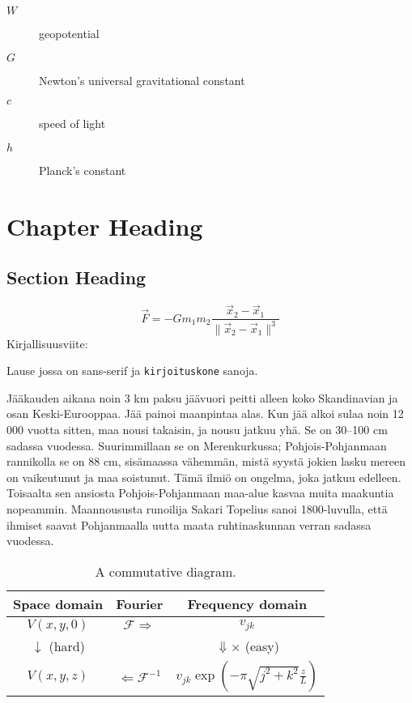 \documentclass[dissertation,vertlayout,pdfa,colorlinks,nologo,table]{aaltoseries}
\begin{document}
\symbols

\begin{description}
\item[$W$] geopotential
\item[$G$] Newton's universal gravitational constant
\item[$c$] speed of light
\item[$h$] Planck's constant
\end{description}


\chapter{Chapter Heading}
\section{Section Heading}
\[
\vec{F}=-G m_1 m_2 \frac{\vec{x}_2-\vec{x}_1}{\lVert{\vec{x}_2-\vec{x}_1}\rVert^3}
\]
\lipsum[1-2]
Kirjallisuusviite: \cite{Knuth1984:The-TeXbook}

Lause jossa on \textsf{sans-serif} ja \texttt{kirjoituskone} sanoja.

Jääkauden aikana noin 3 km paksu jäävuori peitti alleen koko Skandinavian ja
osan Keski-Eurooppaa. Jää painoi maanpintaa alas. Kun jää alkoi sulaa noin 12
000 vuotta sitten, maa nousi takaisin, ja nousu jatkuu yhä. Se on 30–100 cm
sadassa vuodessa. Suurimmillaan se on Merenkurkussa; Pohjois-Pohjanmaan
rannikolla se on 88 cm, sisämaassa vähemmän, mistä syystä jokien lasku mereen
on vaikeutunut ja maa soistunut. Tämä ilmiö on ongelma, joka jatkuu edelleen.
Toisaalta sen ansiosta Pohjois-Pohjanmaan maa-alue kasvaa muita maakuntia
nopeammin. Maannoususta runoilija Sakari Topelius sanoi 1800-luvulla, että
ihmiset saavat Pohjanmaalla uutta maata ruhtinaskunnan verran sadassa vuodessa.

\begin{table}
\caption{A commutative diagram.}
\begin{tabular}{ccc}
\hline
Space domain & Fourier & Frequency domain\tabularnewline
\hline
$V\left(x,y,0\right)$ & $\mathcal{F}\Longrightarrow$ & $v_{jk}$\tabularnewline
$\downarrow$ (hard) &  & $\Downarrow\times$ (easy)\tabularnewline
$V\left(x,y,z\right)$ & $\Longleftarrow\mathcal{F}^{-1}$ & $v_{jk}\exp\left(-\pi\sqrt{j^{2}+k^{2}}\frac{z}{L}\right)$\tabularnewline
\hline
\end{tabular}
\end{table}
\end{document}
